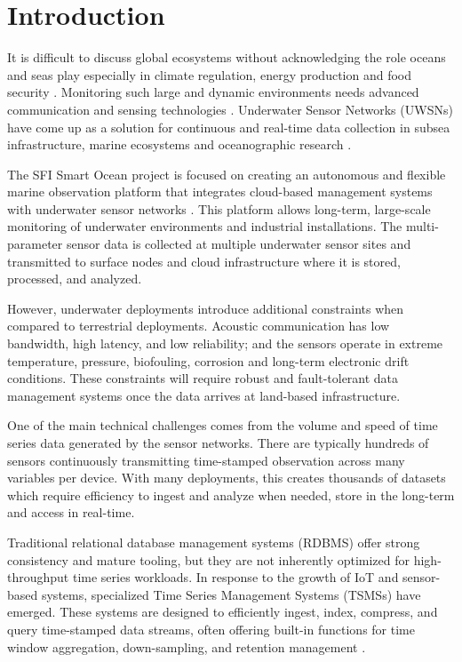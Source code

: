 \chapter{Introduction}
\label{chap:introduction}

It is difficult to discuss global ecosystems without acknowledging the role oceans and seas play especially in climate regulation, energy production and food security \cite{MENDLERDESUAREZ201427}. Monitoring such large and dynamic environments needs advanced communication and sensing technologies \cite{electronics14010007}. Underwater Sensor Networks (UWSNs) have come up as a solution for continuous and real-time data collection in subsea infrastructure, marine ecosystems and oceanographic research \cite{Felemban2015}.

The SFI Smart Ocean project is focused on creating an autonomous and flexible marine observation platform that integrates cloud-based management systems with underwater sensor networks \cite{Forskningsraadet}. This platform allows long-term, large-scale monitoring of underwater environments and industrial installations. The multi-parameter sensor data is collected at multiple underwater sensor sites and transmitted to surface nodes and cloud infrastructure where it is stored, processed, and analyzed. 

However, underwater deployments introduce additional constraints when compared to terrestrial deployments. Acoustic communication has low bandwidth, high latency, and low reliability; and the sensors operate in extreme temperature, pressure, biofouling, corrosion and long-term electronic drift conditions. These constraints will require robust and fault-tolerant data management systems once the data arrives at land-based infrastructure.

One of the main technical challenges comes from the volume and speed of time series data generated by the sensor networks. There are typically hundreds of sensors continuously transmitting time-stamped observation across many variables per device. With many deployments, this creates thousands of datasets which require efficiency to ingest and analyze when needed, store in the long-term and access in real-time. 

Traditional relational database management systems (RDBMS) offer strong consistency and mature tooling, but they are not inherently optimized for high-throughput time series workloads. In response to the growth of IoT and sensor-based systems, specialized Time Series Management Systems (TSMSs) have emerged. These systems are designed to efficiently ingest, index, compress, and query time-stamped data streams, often offering built-in functions for time window aggregation, down-sampling, and retention management \cite{Jensen2017}.

